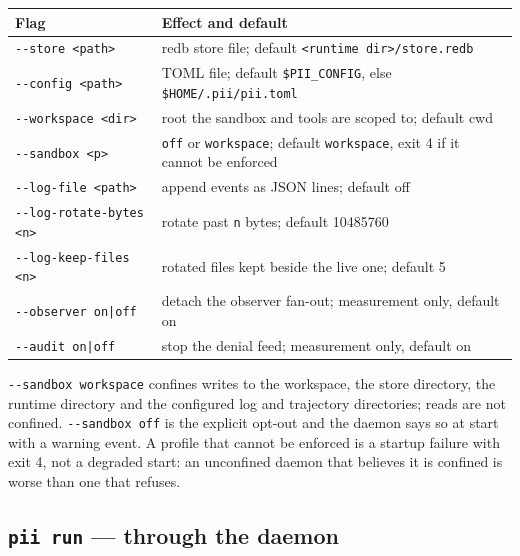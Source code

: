 \begin{center}
\begin{tabular}{@{}>{\raggedright\arraybackslash}p{}>{\raggedright\arraybackslash}p{}@{}}
  \toprule
  \textbf{Flag} & \textbf{Effect and default} \\
  \midrule
  \texttt{-{}-store <path>} & redb store file; default \texttt{<runtime dir>/store.redb} \\
  \texttt{-{}-config <path>} & TOML file; default \texttt{\$PII\_CONFIG}, else \texttt{\$HOME/.pii/pii.toml} \\
  \texttt{-{}-workspace <dir>} & root the sandbox and tools are scoped to; default cwd \\
  \texttt{-{}-sandbox <p>} & \texttt{off} or \texttt{workspace}; default \texttt{workspace}, exit 4 if it cannot be enforced \\
  \texttt{-{}-log-file <path>} & append events as JSON lines; default off \\
  \texttt{-{}-log-rotate-bytes <n>} & rotate past \texttt{n} bytes; default 10485760 \\
  \texttt{-{}-log-keep-files <n>} & rotated files kept beside the live one; default 5 \\
  \texttt{-{}-observer on|off} & detach the observer fan-out; measurement only, default on \\
  \texttt{-{}-audit on|off} & stop the denial feed; measurement only, default on \\
  \bottomrule
\end{tabular}
\end{center}

\texttt{-{}-sandbox workspace} confines writes to the workspace, the store directory, the
runtime directory and the configured log and trajectory directories; reads are not confined.
\texttt{-{}-sandbox off} is the explicit opt-out and the daemon says so at start with a warning
event. A profile that cannot be enforced is a startup failure with exit 4, not a degraded
start: an unconfined daemon that believes it is confined is worse than one that refuses.

\subsection*{\texttt{pii run} --- through the daemon}

